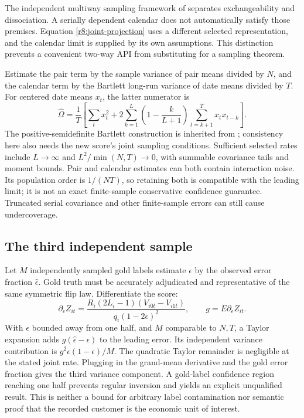 The independent multiway sampling framework of \citet{cluster2021} separates
exchangeability and dissociation. A serially dependent calendar does not
automatically satisfy those premises. Equation \eqref{r8:joint-projection}
uses a different selected representation, and the calendar limit is supplied
by its own assumptions. This distinction prevents a convenient two-way API
from substituting for a sampling theorem.

Estimate the pair term by the sample variance of pair means divided by $N$,
and the calendar term by the Bartlett long-run variance of date means divided
by $T$. For centered date means $x_t$, the latter numerator is
\[
 \widehat\Omega=\frac1T\left[\sum_t x_t^2+
 2\sum_{k=1}^{L}\left(1-\frac{k}{L+1}\right)
       \sum_{t=k+1}^{T}x_tx_{t-k}\right].
\]
The positive-semidefinite Bartlett construction is inherited from
\citet{newey1986}; consistency here also needs the new score's joint sampling
conditions. Sufficient selected rates include $L\to\infty$ and
$L^2/\min(N,T)\to0$, with summable covariance tails and moment bounds.
Pair and calendar estimates can both contain interaction noise. Its population
order is $1/(NT)$, so retaining both is compatible with the leading limit;
it is not an exact finite-sample conservative confidence guarantee. Truncated
serial covariance and other finite-sample errors can still cause undercoverage.

\subsection{The third independent sample}

Let $M$ independently sampled gold labels estimate $\epsilon$ by the observed
error fraction $\hat\epsilon$. Gold truth must be accurately adjudicated and
representative of the same symmetric flip law. Differentiate the score:
\[
 \partial_\epsilon Z_{it}
   =\frac{R_i(2L_i-1)(V_{i0t}-V_{i1t})}
          {q_i(1-2\epsilon)^2},\qquad
 g=E\partial_\epsilon Z_{it}.
\]
With $\epsilon$ bounded away from one half, and $M$ comparable to $N,T$, a
Taylor expansion adds $g(\hat\epsilon-\epsilon)$ to the leading error. Its
independent variance contribution is $g^2\epsilon(1-\epsilon)/M$.
The quadratic Taylor remainder is negligible at the stated joint rate.
Plugging in the grand-mean derivative and the gold error fraction gives the
third variance component. A gold-label confidence region reaching one half
prevents regular inversion and yields an explicit unqualified result. This
is neither a bound for arbitrary label contamination nor semantic proof that
the recorded customer is the economic unit of interest.

